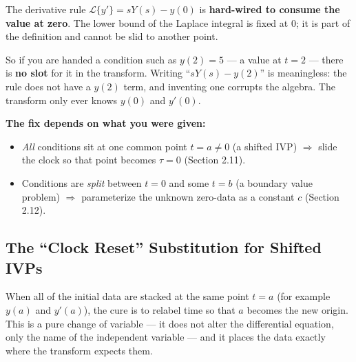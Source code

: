 \documentclass[11pt]{article}
\begin{document}
\begin{warningbox}[The $t=0$ Trap]
The derivative rule $\mathcal{L}\{y'\} = sY(s) - y(0)$ is \textbf{hard-wired to consume the value at zero}. The lower bound of the Laplace integral is fixed at $0$; it is part of the definition and cannot be slid to another point.

\smallskip
So if you are handed a condition such as $y(2) = 5$ --- a value at $t = 2$ --- there is \textbf{no slot} for it in the transform. Writing ``$sY(s) - y(2)$'' is meaningless: the rule does not have a $y(2)$ term, and inventing one corrupts the algebra. The transform only ever knows $y(0)$ and $y'(0)$.

\smallskip
\textbf{The fix depends on what you were given:}
\begin{itemize}[leftmargin=*, itemsep=1pt]
  \item \emph{All} conditions sit at one common point $t = a \ne 0$ (a shifted IVP) $\Rightarrow$ slide the clock so that point becomes $\tau = 0$ (Section 2.11).
  \item Conditions are \emph{split} between $t = 0$ and some $t = b$ (a boundary value problem) $\Rightarrow$ parameterize the unknown zero-data as a constant $c$ (Section 2.12).
\end{itemize}
\end{warningbox}

\subsection{The ``Clock Reset'' Substitution for Shifted IVPs}

When all of the initial data are stacked at the same point $t = a$ (for example $y(a)$ and $y'(a)$), the cure is to relabel time so that $a$ becomes the new origin. This is a pure change of variable --- it does not alter the differential equation, only the name of the independent variable --- and it places the data exactly where the transform expects them.
\end{document}
